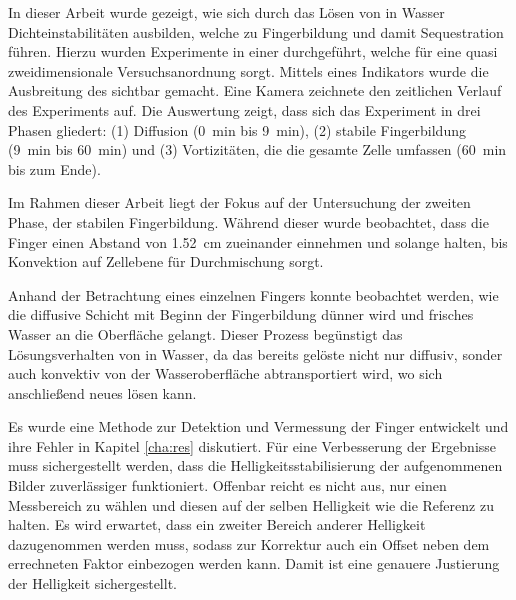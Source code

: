 
\label{cha:con}

In dieser Arbeit wurde gezeigt, wie sich durch das Lösen von \COT in Wasser Dichteinstabilitäten ausbilden, welche zu Fingerbildung und damit \COTm Sequestration führen. 
Hierzu wurden Experimente in einer \HSC durchgeführt, welche für eine quasi zweidimensionale Versuchsanordnung sorgt. Mittels eines Indikators wurde die Ausbreitung des \COT sichtbar gemacht. Eine Kamera zeichnete den zeitlichen Verlauf des Experiments auf.
Die Auswertung zeigt, dass sich das Experiment in drei Phasen gliedert: 
 (1) Diffusion (\SI{0}{\minute} bis \SI{9}{\minute}),
 (2) stabile Fingerbildung (\SI{9}{\minute} bis \SI{60}{\minute}) und
 (3) Vortizitäten, die die gesamte Zelle umfassen (\SI{60}{\minute} bis zum Ende). 

Im Rahmen dieser Arbeit liegt der Fokus auf der Untersuchung der zweiten Phase, der stabilen Fingerbildung. Während dieser wurde beobachtet, dass die Finger einen Abstand von \SI[round-precision=2]{1.52}{\centi\meter} zueinander einnehmen und solange halten, bis Konvektion auf Zellebene für Durchmischung sorgt.

Anhand der Betrachtung eines einzelnen Fingers konnte beobachtet werden, wie die diffusive Schicht mit Beginn der Fingerbildung dünner wird und frisches Wasser an die Oberfläche gelangt. Dieser Prozess begünstigt das Lösungsverhalten von \COT in Wasser, da das bereits gelöste \COT nicht nur diffusiv, sonder auch konvektiv von der Wasseroberfläche abtransportiert wird, wo sich anschließend neues \COT lösen kann. 

Es wurde eine Methode zur Detektion und Vermessung der Finger entwickelt und ihre Fehler in Kapitel \ref{cha:res} diskutiert. Für eine Verbesserung der Ergebnisse muss sichergestellt werden, dass die Helligkeitsstabilisierung der aufgenommenen Bilder zuverlässiger funktioniert. Offenbar reicht es nicht aus, nur einen Messbereich zu wählen und diesen auf der selben Helligkeit wie die Referenz zu halten. Es wird erwartet, dass ein zweiter Bereich anderer Helligkeit dazugenommen werden muss, sodass zur Korrektur auch ein Offset neben dem errechneten Faktor einbezogen werden kann. Damit ist eine genauere Justierung der Helligkeit sichergestellt.




